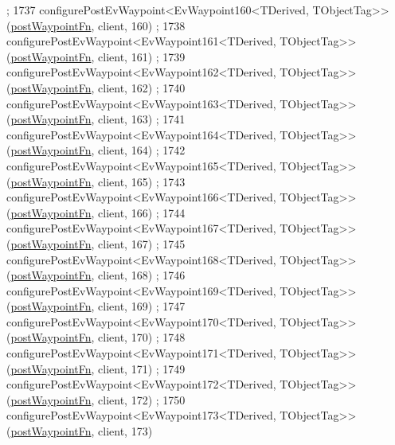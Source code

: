 \begin{DoxyCode}
      ;
1737     configurePostEvWaypoint<EvWaypoint160<TDerived, TObjectTag>>(\hyperlink{classsmacc_1_1WaypointEventDispatcher_a6bccf6a93a827634b7b5e67ac0e4ec57}{postWaypointFn}, client, 160)
      ;
1738     configurePostEvWaypoint<EvWaypoint161<TDerived, TObjectTag>>(\hyperlink{classsmacc_1_1WaypointEventDispatcher_a6bccf6a93a827634b7b5e67ac0e4ec57}{postWaypointFn}, client, 161)
      ;
1739     configurePostEvWaypoint<EvWaypoint162<TDerived, TObjectTag>>(\hyperlink{classsmacc_1_1WaypointEventDispatcher_a6bccf6a93a827634b7b5e67ac0e4ec57}{postWaypointFn}, client, 162)
      ;
1740     configurePostEvWaypoint<EvWaypoint163<TDerived, TObjectTag>>(\hyperlink{classsmacc_1_1WaypointEventDispatcher_a6bccf6a93a827634b7b5e67ac0e4ec57}{postWaypointFn}, client, 163)
      ;
1741     configurePostEvWaypoint<EvWaypoint164<TDerived, TObjectTag>>(\hyperlink{classsmacc_1_1WaypointEventDispatcher_a6bccf6a93a827634b7b5e67ac0e4ec57}{postWaypointFn}, client, 164)
      ;
1742     configurePostEvWaypoint<EvWaypoint165<TDerived, TObjectTag>>(\hyperlink{classsmacc_1_1WaypointEventDispatcher_a6bccf6a93a827634b7b5e67ac0e4ec57}{postWaypointFn}, client, 165)
      ;
1743     configurePostEvWaypoint<EvWaypoint166<TDerived, TObjectTag>>(\hyperlink{classsmacc_1_1WaypointEventDispatcher_a6bccf6a93a827634b7b5e67ac0e4ec57}{postWaypointFn}, client, 166)
      ;
1744     configurePostEvWaypoint<EvWaypoint167<TDerived, TObjectTag>>(\hyperlink{classsmacc_1_1WaypointEventDispatcher_a6bccf6a93a827634b7b5e67ac0e4ec57}{postWaypointFn}, client, 167)
      ;
1745     configurePostEvWaypoint<EvWaypoint168<TDerived, TObjectTag>>(\hyperlink{classsmacc_1_1WaypointEventDispatcher_a6bccf6a93a827634b7b5e67ac0e4ec57}{postWaypointFn}, client, 168)
      ;
1746     configurePostEvWaypoint<EvWaypoint169<TDerived, TObjectTag>>(\hyperlink{classsmacc_1_1WaypointEventDispatcher_a6bccf6a93a827634b7b5e67ac0e4ec57}{postWaypointFn}, client, 169)
      ;
1747     configurePostEvWaypoint<EvWaypoint170<TDerived, TObjectTag>>(\hyperlink{classsmacc_1_1WaypointEventDispatcher_a6bccf6a93a827634b7b5e67ac0e4ec57}{postWaypointFn}, client, 170)
      ;
1748     configurePostEvWaypoint<EvWaypoint171<TDerived, TObjectTag>>(\hyperlink{classsmacc_1_1WaypointEventDispatcher_a6bccf6a93a827634b7b5e67ac0e4ec57}{postWaypointFn}, client, 171)
      ;
1749     configurePostEvWaypoint<EvWaypoint172<TDerived, TObjectTag>>(\hyperlink{classsmacc_1_1WaypointEventDispatcher_a6bccf6a93a827634b7b5e67ac0e4ec57}{postWaypointFn}, client, 172)
      ;
1750     configurePostEvWaypoint<EvWaypoint173<TDerived, TObjectTag>>(\hyperlink{classsmacc_1_1WaypointEventDispatcher_a6bccf6a93a827634b7b5e67ac0e4ec57}{postWaypointFn}, client, 173)

\end{DoxyCode}
